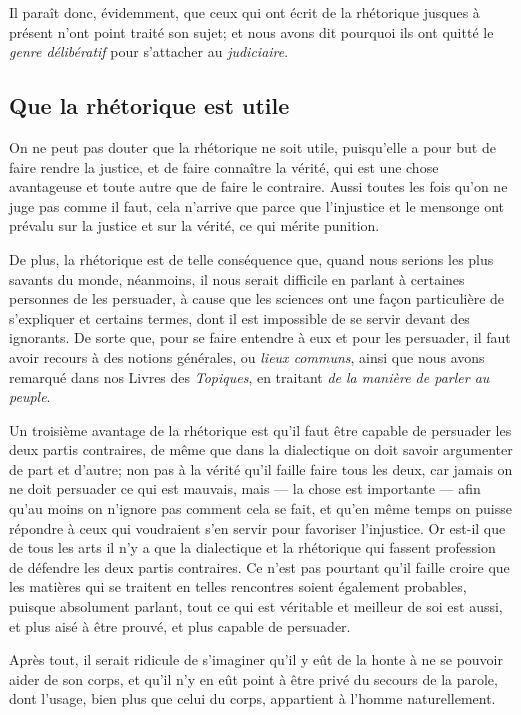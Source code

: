 \bigbreak

Il paraît donc, évidemment, que ceux qui ont écrit de la rhétorique jusques à présent n'ont point traité son sujet; et nous avons dit pourquoi ils ont
quitté le \emph{genre délibératif} pour s'attacher au \emph{judiciaire}.

\subsection{Que la rhétorique est utile}

On ne peut pas douter que la rhétorique ne soit utile, puisqu'elle a pour but de faire rendre la justice, et de faire connaître la vérité, qui est
une chose avantageuse et toute autre que de faire le contraire. Aussi toutes les fois qu'on ne juge pas comme il faut, cela n'arrive que parce que
l'injustice et le mensonge ont prévalu sur la justice et sur la vérité, ce qui mérite punition. 

De plus, la rhétorique est de telle conséquence que, quand nous serions les plus savants du monde, néanmoins, il nous serait difficile en parlant à
certaines personnes de les persuader, à cause que les sciences ont une façon particulière de s'expliquer et certains termes, dont il est impossible de
se servir devant des ignorants. De sorte que, pour se faire entendre à eux et pour les persuader, il faut avoir recours à des notions générales, ou
\emph{lieux communs}, ainsi que nous avons remarqué dans nos Livres des \emph{Topiques}, en traitant \emph{de la manière de parler au peuple}.

Un troisième avantage de la rhétorique est qu'il faut être capable de persuader les deux partis contraires, de même que dans la dialectique on doit
savoir argumenter de part et d'autre; non pas à la vérité qu'il faille faire tous les deux, car jamais on ne doit persuader ce qui est mauvais, mais --- la
chose est importante --- afin qu'au moins on n'ignore pas comment cela se fait, et qu'en même temps on puisse répondre à ceux qui voudraient s'en servir
pour favoriser l'injustice. Or est-il que de tous les arts il n'y a que la dialectique et la rhétorique qui fassent profession de défendre les deux partis
contraires. Ce n'est pas pourtant qu'il faille croire que les matières qui se traitent en telles rencontres soient également probables, puisque absolument
parlant, tout ce qui est véritable et meilleur de soi est aussi, et plus aisé à être prouvé, et plus capable de persuader.

Après tout, il serait ridicule de s'imaginer qu'il y eût de la honte à ne se pouvoir aider de son corps, et qu'il n'y en eût point à être privé du secours
de la parole, dont l'usage, bien plus que celui du corps, appartient à l'homme naturellement. 

